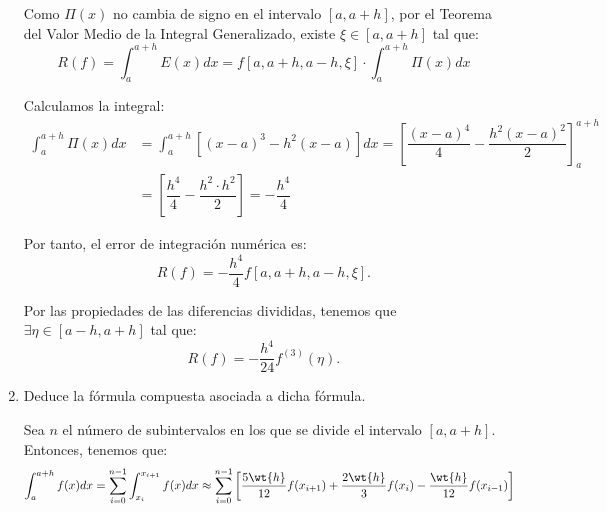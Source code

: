 \begin{ejercicio}
\begin{enumerate}
        Como $\Pi(x)$ no cambia de signo en el intervalo $[a, a + h]$, por el Teorema del Valor Medio de la Integral Generalizado, existe $\xi\in [a, a + h]$ tal que:
        \begin{equation*}
            R(f) = \int_{a}^{a+h} E(x)dx = f[a, a + h, a - h, \xi]\cdot \int_{a}^{a+h} \Pi(x)dx
        \end{equation*}

        Calculamos la integral:
        \begin{align*}
            \int_{a}^{a+h} \Pi(x)dx &= \int_{a}^{a+h} \left[(x - a)^3 - h^2(x - a)\right]dx
            = \left[\dfrac{(x - a)^4}{4} - \dfrac{h^2(x - a)^2}{2}\right]_{a}^{a+h}\\
            &= \left[\dfrac{h^4}{4} - \dfrac{h^2\cdot h^2}{2}\right] = -\dfrac{h^4}{4}
        \end{align*}

        Por tanto, el error de integración numérica es:
        \begin{equation*}
            R(f) = -\dfrac{h^4}{4}f[a, a + h, a - h, \xi].
        \end{equation*}

        Por las propiedades de las diferencias divididas, tenemos que $\exists \eta\in [a-h, a + h]$ tal que:
        \begin{equation*}
            R(f) = -\dfrac{h^4}{24}f^{(3)}(\eta).
        \end{equation*}

        \item Deduce la fórmula compuesta asociada a dicha fórmula.
        
        Sea $n$ el número de subintervalos en los que se divide el intervalo $[a, a + h]$. Entonces, tenemos que:
        \begin{align*}
            \int_{a}^{a + h} f(x)dx &= \sum_{i=0}^{n-1}\int_{x_i}^{x_{i+1}} f(x)dx
            \approx \sum_{i=0}^{n-1}\left[\frac{5\wt{h}}{12}f(x_{i+1}) + \frac{2\wt{h}}{3}f(x_i) - \frac{\wt{h}}{12}f(x_{i-1})\right]
        \end{align*}
    \end{enumerate}
\end{ejercicio}

